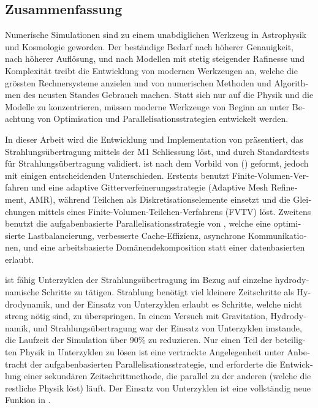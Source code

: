 \begin{otherlanguage}{german}
\chapter*{Zusammenfassung}

Numerische Simulationen sind zu einem unabdiglichen Werkzeug in Astrophysik und Kosmologie
geworden. Der best\"andige Bedarf nach h\"oherer Genauigkeit, nach h\"oherer Aufl\"osung, und nach
Modellen mit stetig steigender Rafinesse und Komplexit\"at treibt die Entwicklung von modernen
Werkzeugen an, welche die gr\"ossten Rechnersysteme anzielen und von numerischen Methoden und
Algorithmen des neusten Standes Gebrauch machen. Statt sich nur auf die Physik und die Modelle zu
konzentrieren, m\"ussen moderne Werkzeuge von Beginn an unter Beachtung von Optimisation und
Parallelisationsstrategien entwickelt werden.

In dieser Arbeit wird die Entwicklung und Implementation von \GEARRT pr\"asentiert, das
Strahlungs\"ubertragung mittels der M1 Schliessung l\"ost, und durch Standardtests f\"ur
Strahlungs\"ubertragung validiert. \GEARRT ist nach dem Vorbild von 
(\cite{ramses-rt13}) geformt, jedoch mit einigen entscheidenden Unterschieden. Erstents benutzt
 Finite-Volumen-Verfahren und eine adaptive Gitterverfeinerungsstrategie
(Adaptive Mesh Refinement, AMR), w\"ahrend \GEARRT Teilchen als Diskretisationselemente einsetzt
und die Gleichungen mittels eines Finite-Volumen-Teilchen-Verfahrens (FVTV) l\"ost. Zweitens
benutzt \GEARRT die aufgabenbasierte Parallelisationsstrategie von \swift, welche eine optimisierte
Lastbalancierung, verbesserte Cache-Effizienz, asynchrone Kommunikationen, und eine arbeitsbasierte
Dom\"anendekomposition statt einer datenbasierten erlaubt.

\GEARRT ist f\"ahig Unterzyklen der Strahlungs\"ubertragung im Bezug auf einzelne hydrodynamische
Schritte zu t\"atigen. Strahlung ben\"otigt viel kleinere Zeitschritte als Hydrodynamik, und der
Einsatz von Unterzyklen erlaubt es Schritte, welche nicht streng n\"otig sind, zu \"uberspringen.
In einem Versuch mit Gravitation, Hydrodynamik, und Strahlungs\"ubertragung war der Einsatz von
Unterzyklen imstande, die Laufzeit der Simulation \"uber 90\% zu reduzieren.
Nur einen Teil der beteiligten Physik in Unterzyklen zu l\"osen ist eine vertrackte Angelegenheit
unter Anbetracht der aufgabenbasierten Parallelisationsstrategie, und erforderte die Entwicklung
einer sekund\"aren Zeitschrittmethode, die parallel zu der anderen (welche die restliche Physik
l\"ost) l\"auft. Der Einsatz von Unterzyklen ist eine vollst\"andig neue Funkion in \swift.


\end{otherlanguage}
